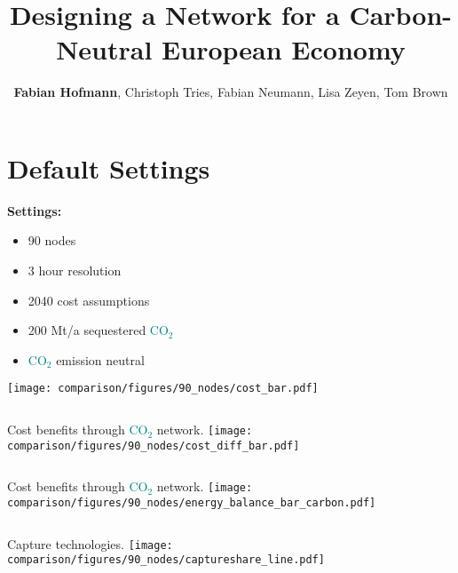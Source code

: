 \documentclass[12pt, aspectratio=169]{beamer}
\title{Designing a \carbon{} Network for a Carbon-Neutral European Economy}
\author{\textbf{Fabian Hofmann}, Christoph Tries, Fabian Neumann, Lisa Zeyen, Tom Brown}
\institute{Technical University Berlin}
\date{}
\newcommand{\carbon}{\textcolor{teal}{CO$_2$}}
\begin{document}
\begin{frame}[plain]
    \titlepage
\end{frame}


\section*{Default Settings}

\begin{frame}
    \textbf{Settings:}
    \begin{itemize}
        \item 90 nodes
        \item 3 hour resolution
        \item 2040 cost assumptions
        \item 200 Mt/a sequestered \carbon{}
        \item \carbon{} emission neutral
    \end{itemize}
\end{frame}

\begin{frame}
        \texttt{[image: comparison/figures/90\_nodes/cost\_bar.pdf]}
\end{frame}

\begin{frame}
    \begin{columns}
        Cost benefits through \carbon{} network.
        \texttt{[image: comparison/figures/90\_nodes/cost\_diff\_bar.pdf]}
    \end{columns}
\end{frame}


\begin{frame}
    \begin{columns}
        Cost benefits through \carbon{} network.
        \texttt{[image: comparison/figures/90\_nodes/energy\_balance\_bar\_carbon.pdf]}
    \end{columns}
\end{frame}


\begin{frame}
    \begin{columns}
        Capture technologies.
        \texttt{[image: comparison/figures/90\_nodes/captureshare\_line.pdf]}
    \end{columns}
\end{frame}
\end{document}
